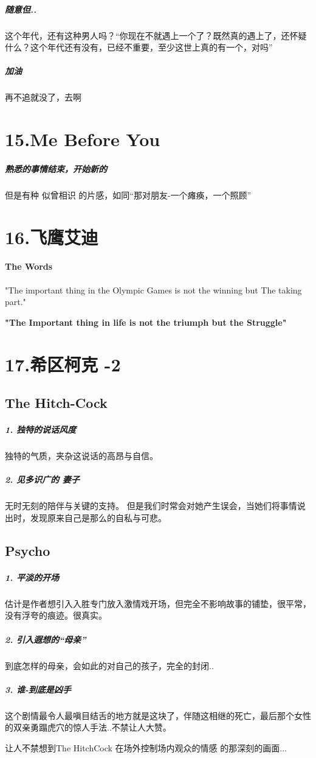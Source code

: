 \documentclass[UTF8,a4paper,8pt]{ctexbook}
\begin{document}
		\subparagraph{随意但..}这个年代，还有这种男人吗？“你现在不就遇上一个了？既然真的遇上了，还怀疑什么？这个年代还有没有，已经不重要，至少这世上真的有一个，对吗”
		
		\subparagraph{加油}再不追就没了，去啊
	
	\newpage
	\section*{15.Me Before You}
		\subparagraph{熟悉的事情结束，开始新的}但是有种 似曾相识 的片感，如同“那对朋友-一个瘫痪，一个照顾”
		
	\newpage
	\section*{16.飞鹰艾迪}
	\paragraph{The Words}"The important thing in the Olympic Games is not the winning but The taking part."
	
	\textbf{"The Important thing in life is not the triumph but the Struggle"}
	
	\newpage
	\section*{17.希区柯克 -2}
		\subsection*{The Hitch-Cock}
			\subparagraph{1. 独特的说话风度}独特的气质，夹杂这说话的高昂与自信。
			\subparagraph{2. 见多识广的 妻子}无时无刻的陪伴与关键的支持。
			但是我们时常会对她产生误会，当她们将事情说出时，发现原来自己是那么的自私与可悲。 
		
		\subsection*{Psycho}
			\subparagraph{1. 平淡的开场}估计是作者想引入入胜专门放入激情戏开场，但完全不影响故事的铺垫，很平常，没有浮夸的痕迹。很真实。
			
			\subparagraph{2. 引入遐想的“母亲”} 到底怎样的母亲，会如此的对自己的孩子，完全的封闭..
			\subparagraph{3. 谁-到底是凶手}这个剧情最令人最嗔目结舌的地方就是这块了，伴随这相继的死亡，最后那个女性的双亲勇蹋虎穴的惊人手法..不禁让人大赞。
			
			让人不禁想到The HitchCock 在场外控制场内观众的情感 的那深刻的画面...
			
\end{document}
